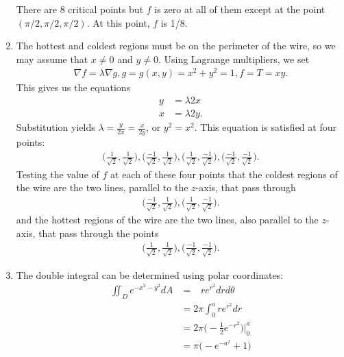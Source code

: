 \documentclass{article}
\begin{document}
\begin{enumerate}
There are 8 critical points but $f$ is zero at all of them except at the point $(\pi/2,\pi/2,\pi/2)$. At this point, $f$ is 1/8. 
\item %
The hottest and coldest regions must be on the perimeter of the wire, so we may assume that $x\ne0$ and $y\ne0$. Using Lagrange multipliers, we set
\begin{align*}
  \nabla f = \lambda \nabla g, g=g(x,y)=x^2+y^2=1, f=T=xy.
\end{align*}
This gives us the equations
\begin{align*}
 y&=\lambda 2x \\
  x&=\lambda 2y.
\end{align*}
Substitution yields $\lambda = \frac{y}{2x}=\frac{x}{2y}$, or $y^2=x^2$. This equation is satisfied at four points:
\begin{align*}
 \Big(\frac{1}{\sqrt{2}},\frac{1}{\sqrt{2}}\Big),
 \Big(\frac{-1}{\sqrt{2}},\frac{1}{\sqrt{2}}\Big),
 \Big(\frac{1}{\sqrt{2}},\frac{-1}{\sqrt{2}}\Big),
 \Big(\frac{-1}{\sqrt{2}},\frac{-1}{\sqrt{2}}\Big).
\end{align*}
Testing the value of $f$ at each of these four points that the coldest regions of the wire are the two lines, parallel to the $z$-axis, that pass through 
\begin{align*}
 \Big(\frac{-1}{\sqrt{2}},\frac{1}{\sqrt{2}}\Big),
 \Big(\frac{1}{\sqrt{2}},\frac{-1}{\sqrt{2}}\Big).
\end{align*}
and the hottest regions of the wire are the two lines, also parallel to the $z$-axis, that pass through the points
\begin{align*}
 \Big(\frac{1}{\sqrt{2}},\frac{1}{\sqrt{2}}\Big),
 \Big(\frac{-1}{\sqrt{2}},\frac{-1}{\sqrt{2}}\Big).
\end{align*}
\item %
The double integral can be determined using polar coordinates:
\begin{align*}
\iint_De^{-x^2-y^2}dA 
&=
  \mathop{\int_0^{2\pi} \!\! \int_{0}^a} re^{r^2}drd\theta\\
  &=2\pi\int_0^are^{r^2}dr \\
  &=2\pi\big(-\frac{1}{2}e^{-r^2}\big)\big|_0^a\\
  &=\pi\big(-e^{-a^2}+1\big)
\end{align*}


\end{enumerate}
\end{document}
